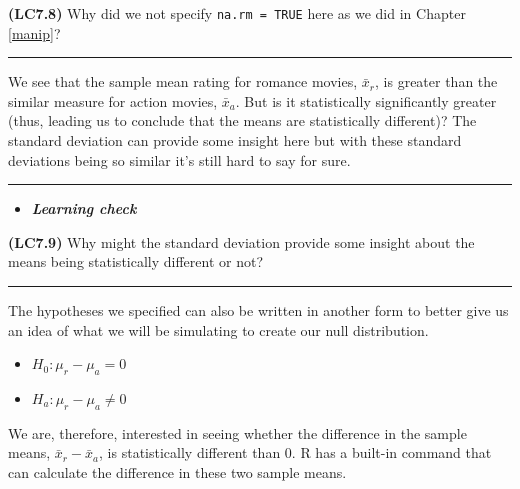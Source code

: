 \documentclass[]{tufte-book}
\newenvironment{Shaded}{\begin{snugshade}}{\end{snugshade}}
\newcommand{\KeywordTok}[1]{\textcolor[rgb]{0.13,0.29,0.53}{\textbf{{#1}}}}
\newcommand{\DataTypeTok}[1]{\textcolor[rgb]{0.13,0.29,0.53}{{#1}}}
\newcommand{\StringTok}[1]{\textcolor[rgb]{0.31,0.60,0.02}{{#1}}}
\newcommand{\NormalTok}[1]{{#1}}
\let\oldrule=\rule
\renewcommand{\rule}[1]{\oldrule{\linewidth}}
\providecommand{\tightlist}{%
  \setlength{\itemsep}{0pt}\setlength{\parskip}{0pt}}
\newenvironment{rmdblock}[1]
  {\begin{shaded*}
  \begin{itemize}
  \renewcommand{\labelitemi}{
    \raisebox{-.7\height}[0pt][0pt]{
    }
  }
  \item
  }
  {
  \end{itemize}
  \end{shaded*}
  }
\newenvironment{learncheck}
  {\begin{rmdblock}{warning}}
  {\end{rmdblock}}
\begin{document}
\textbf{(LC7.8)} Why did we not specify \texttt{na.rm\ =\ TRUE} here as
we did in Chapter \ref{manip}?

\begin{center}\rule{0.5\linewidth}{\linethickness}\end{center}

We see that the sample mean rating for romance movies, \(\bar{x}_{r}\),
is greater than the similar measure for action movies, \(\bar{x}_a\).
But is it statistically significantly greater (thus, leading us to
conclude that the means are statistically different)? The standard
deviation can provide some insight here but with these standard
deviations being so similar it's still hard to say for sure.

\begin{center}\rule{0.5\linewidth}{\linethickness}\end{center}

\begin{learncheck}
\textbf{\emph{Learning check}}
\end{learncheck}

\textbf{(LC7.9)} Why might the standard deviation provide some insight
about the means being statistically different or not?

\begin{center}\rule{0.5\linewidth}{\linethickness}\end{center}

The hypotheses we specified can also be written in another form to
better give us an idea of what we will be simulating to create our null
distribution.

\begin{itemize}
\tightlist
\item
  \(H_0: \mu_r - \mu_a = 0\)
\item
  \(H_a: \mu_r - \mu_a \ne 0\)
\end{itemize}

We are, therefore, interested in seeing whether the difference in the
sample means, \(\bar{x}_r - \bar{x}_a\), is statistically different than
0. R has a built-in command that can calculate the difference in these
two sample means.

\begin{Shaded}
\end{Shaded}
\end{document}
